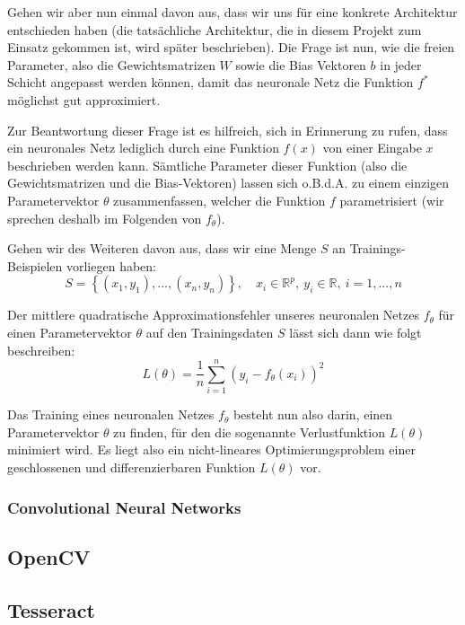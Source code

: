 Gehen wir aber nun einmal davon aus, dass wir uns f\"ur eine konkrete
Architektur entschieden haben (die tats\"achliche Architektur, die in
diesem Projekt zum Einsatz gekommen ist, wird sp\"ater beschrieben).
Die Frage ist nun, wie die freien Parameter, also die
Gewichtsmatrizen $W$ sowie die Bias Vektoren $b$ in jeder Schicht angepasst
werden k\"onnen, damit das neuronale Netz die Funktion $f^*$ m\"oglichst
gut approximiert.

Zur Beantwortung dieser Frage ist es hilfreich, sich in Erinnerung
zu rufen, dass ein neuronales Netz lediglich durch eine Funktion
$f(x)$ von einer Eingabe $x$ beschrieben werden kann.
S\"amtliche Parameter dieser Funktion (also die Gewichtsmatrizen und
die Bias-Vektoren) lassen sich o.B.d.A. zu einem einzigen
Parametervektor $\theta$ zusammenfassen, welcher die Funktion $f$
parametrisiert (wir sprechen deshalb im Folgenden von $f_\theta$).

Gehen wir des Weiteren davon aus, dass wir eine Menge $S$ an Trainings-Beispielen
vorliegen haben:
\begin{equation}
    S = \left\{ (x_1, y_1), ..., (x_n, y_n) \right\},
    \quad x_i \in \mathbb{R}^p, \  y_i \in \mathbb{R}, \  i=1, ..., n
\end{equation}

Der mittlere quadratische Approximationsfehler unseres neuronalen Netzes
$f_\theta$ f\"ur einen Parametervektor $\theta$ auf den Trainingsdaten $S$
l\"asst sich dann wie folgt beschreiben:
\begin{equation}
    L(\theta) = \frac{1}{n} \sum_{i=1}^n (y_i - f_\theta(x_i))^2
\end{equation}

Das Training eines neuronalen Netzes $f_\theta$ besteht nun also darin,
einen Parametervektor $\theta$ zu finden, f\"ur den die sogenannte
Verlustfunktion $L(\theta)$ minimiert wird.
Es liegt also ein nicht-lineares Optimierungsproblem einer geschlossenen
und differenzierbaren Funktion $L(\theta)$ vor.

\subsubsection{Convolutional Neural Networks}

\subsection{OpenCV}

\subsection{Tesseract}